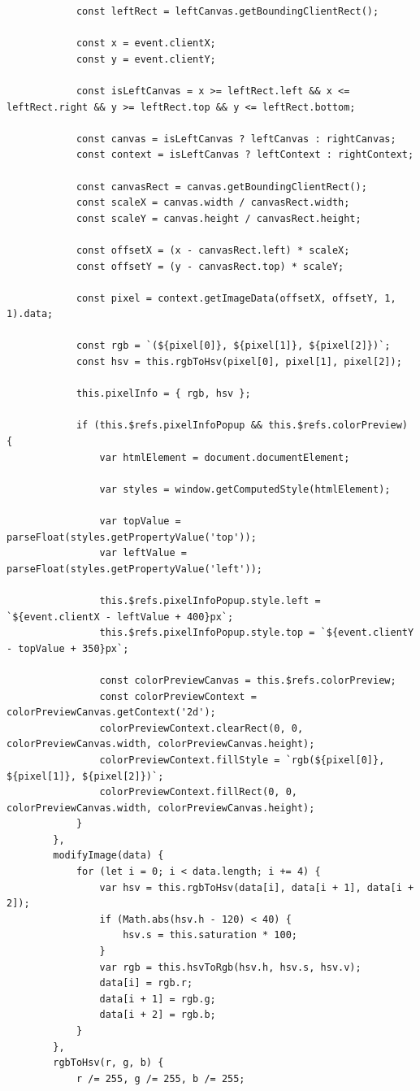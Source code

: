 \documentclass[oneside,14pt]{extarticle}
\begin{document}
\begin{normalsize}
\begin{tiny}
\begin{lstlisting}
			const leftRect = leftCanvas.getBoundingClientRect();
			
			const x = event.clientX;
			const y = event.clientY;
			
			const isLeftCanvas = x >= leftRect.left && x <= leftRect.right && y >= leftRect.top && y <= leftRect.bottom;
			
			const canvas = isLeftCanvas ? leftCanvas : rightCanvas;
			const context = isLeftCanvas ? leftContext : rightContext;
			
			const canvasRect = canvas.getBoundingClientRect();
			const scaleX = canvas.width / canvasRect.width;
			const scaleY = canvas.height / canvasRect.height;
			
			const offsetX = (x - canvasRect.left) * scaleX;
			const offsetY = (y - canvasRect.top) * scaleY;
			
			const pixel = context.getImageData(offsetX, offsetY, 1, 1).data;
			
			const rgb = `(${pixel[0]}, ${pixel[1]}, ${pixel[2]})`;
			const hsv = this.rgbToHsv(pixel[0], pixel[1], pixel[2]);
			
			this.pixelInfo = { rgb, hsv };
			
			if (this.$refs.pixelInfoPopup && this.$refs.colorPreview) {
				var htmlElement = document.documentElement;
				
				var styles = window.getComputedStyle(htmlElement);
				
				var topValue = parseFloat(styles.getPropertyValue('top'));
				var leftValue = parseFloat(styles.getPropertyValue('left'));
				
				this.$refs.pixelInfoPopup.style.left = `${event.clientX - leftValue + 400}px`;
				this.$refs.pixelInfoPopup.style.top = `${event.clientY - topValue + 350}px`;
				
				const colorPreviewCanvas = this.$refs.colorPreview;
				const colorPreviewContext = colorPreviewCanvas.getContext('2d');
				colorPreviewContext.clearRect(0, 0, colorPreviewCanvas.width, colorPreviewCanvas.height);
				colorPreviewContext.fillStyle = `rgb(${pixel[0]}, ${pixel[1]}, ${pixel[2]})`;
				colorPreviewContext.fillRect(0, 0, colorPreviewCanvas.width, colorPreviewCanvas.height);
			}
		},
		modifyImage(data) {
			for (let i = 0; i < data.length; i += 4) {
				var hsv = this.rgbToHsv(data[i], data[i + 1], data[i + 2]);
				if (Math.abs(hsv.h - 120) < 40) {
					hsv.s = this.saturation * 100;
				}
				var rgb = this.hsvToRgb(hsv.h, hsv.s, hsv.v);
				data[i] = rgb.r;
				data[i + 1] = rgb.g;
				data[i + 2] = rgb.b;
			}
		},
		rgbToHsv(r, g, b) {
			r /= 255, g /= 255, b /= 255;
			

\end{lstlisting}
\end{tiny}
\end{normalsize}
\end{document}
